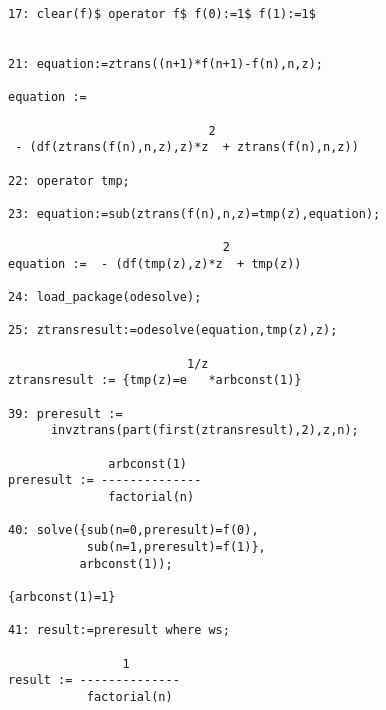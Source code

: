 \begin{verbatim}
17: clear(f)$ operator f$ f(0):=1$ f(1):=1$


21: equation:=ztrans((n+1)*f(n+1)-f(n),n,z);

equation := 

                            2
 - (df(ztrans(f(n),n,z),z)*z  + ztrans(f(n),n,z))

22: operator tmp;

23: equation:=sub(ztrans(f(n),n,z)=tmp(z),equation);

                              2
equation :=  - (df(tmp(z),z)*z  + tmp(z))

24: load_package(odesolve);

25: ztransresult:=odesolve(equation,tmp(z),z);

                         1/z
ztransresult := {tmp(z)=e   *arbconst(1)}

39: preresult :=
      invztrans(part(first(ztransresult),2),z,n);

              arbconst(1)
preresult := --------------
              factorial(n)

40: solve({sub(n=0,preresult)=f(0),
           sub(n=1,preresult)=f(1)},
          arbconst(1));

{arbconst(1)=1}

41: result:=preresult where ws;

                1
result := --------------
           factorial(n)
\end{verbatim}
